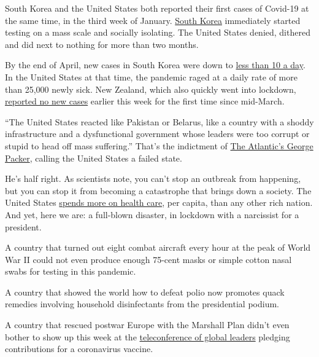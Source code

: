 South Korea and the United States both reported their first cases of
Covid-19 at the same time, in the third week of January.
\href{https://www.nytimes3xbfgragh.onion/2020/03/23/world/asia/coronavirus-south-korea-flatten-curve.html}{South
Korea} immediately started testing on a mass scale and socially
isolating. The United States denied, dithered and did next to nothing
for more than two months.

By the end of April, new cases in South Korea were down to
\href{https://www.statista.com/statistics/1102777/south-korea-covid-19-daily-new-cases/}{less
than 10 a day}. In the United States at that time, the pandemic raged at
a daily rate of more than 25,000 newly sick. New Zealand, which also
quickly went into lockdown,
\href{https://www.nytimes3xbfgragh.onion/reuters/2020/05/03/world/asia/03reuters-health-coronavirus-newzealand-toll.html}{reported
no new cases} earlier this week for the first time since mid-March.

``The United States reacted like Pakistan or Belarus, like a country
with a shoddy infrastructure and a dysfunctional government whose
leaders were too corrupt or stupid to head off mass suffering.'' That's
the indictment of
\href{https://www.theatlantic.com/magazine/archive/2020/06/underlying-conditions/610261/}{The
Atlantic's George Packer}, calling the United States a failed state.

He's half right. As scientists note, you can't stop an outbreak from
happening, but you can stop it from becoming a catastrophe that brings
down a society. The United States
\href{https://www.nytimes3xbfgragh.onion/2020/04/14/opinion/sunday/covid-inequality-health-care.html}{spends
more on health care}, per capita, than any other rich nation. And yet,
here we are: a full-blown disaster, in lockdown with a narcissist for a
president.

A country that turned out eight combat aircraft every hour at the peak
of World War II could not even produce enough 75-cent masks or simple
cotton nasal swabs for testing in this pandemic.

A country that showed the world how to defeat polio now promotes quack
remedies involving household disinfectants from the presidential podium.

A country that rescued postwar Europe with the Marshall Plan didn't even
bother to show up this week at the
\href{https://www.nytimes3xbfgragh.onion/2020/05/04/world/europe/eu-coronavirus-vaccine.html}{teleconference
of global leaders} pledging contributions for a coronavirus vaccine.

